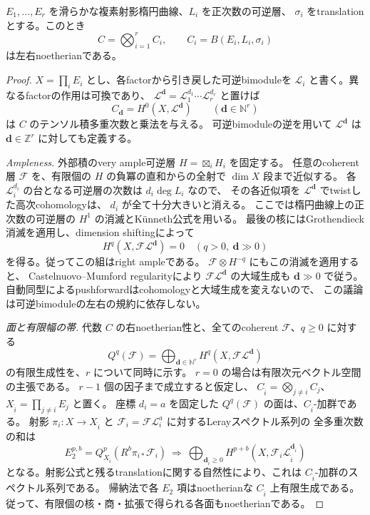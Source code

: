 \begin{lemma}[楕円THCRの有限テンソル積]
\label{lem:elliptic-thcr-tensor-noeth}
 \(E_1,\ldots,E_r\) を滑らかな複素射影楕円曲線、\(L_i\) を正次数の可逆層、
 \(\sigma_i\) をtranslationとする。このとき
 \[
 C=\bigotimes_{i=1}^r C_i,\qquad C_i=B(E_i,L_i,\sigma_i)
 \]
 は左右noetherianである。
\end{lemma}
\begin{proof}
 \(X=\prod_iE_i\) とし、各factorから引き戻した可逆bimoduleを
 \(\mathcal L_i\) と書く。異なるfactorの作用は可換であり、
 \(\mathcal L^{\mathbf d}=\mathcal L_1^{d_1}\cdots\mathcal L_r^{d_r}\) と置けば
 \[
 C_{\mathbf d}=H^0(X,\mathcal L^{\mathbf d})\qquad(\mathbf d\in\mathbb N^r)
 \]
 は \(C\) のテンソル積多重次数と乗法を与える。
 可逆bimoduleの逆を用いて \(\mathcal L^{\mathbf d}\) は
 \(\mathbf d\in\mathbb Z^r\) に対しても定義する。

 \emph{Ampleness.}
 外部積のvery ample可逆層 \(H=\boxtimes_iH_i\) を固定する。
 任意のcoherent層 \(\mathcal F\) を、有限個の \(H\) の負冪の直和からの全射で
 \(\dim X\) 段まで近似する。
 各 \(\mathcal L_i^{d_i}\) の台となる可逆層の次数は \(d_i\deg L_i\) なので、
 その各近似項を \(\mathcal L^{\mathbf d}\) でtwistした高次cohomologyは、
 \(d_i\) が全て十分大きいと消える。
 ここでは楕円曲線上の正次数の可逆層の \(H^1\) の消滅とK\"unneth公式を用いる。
 最後の核にはGrothendieck消滅を適用し、dimension shiftingによって
 \[
 H^q(X,\mathcal F\mathcal L^{\mathbf d})=0
 \quad(q>0,\ \mathbf d\gg0)
 \]
 を得る。従ってこの組はright ampleである。
 \(\mathcal F\otimes H^{-q}\) にもこの消滅を適用すると、
 Castelnuovo--Mumford regularityにより
 \(\mathcal F\mathcal L^{\mathbf d}\) の大域生成も \(\mathbf d\gg0\) で従う。
 自動同型によるpushforwardはcohomologyと大域生成を変えないので、
 この議論は可逆bimoduleの左右の規約に依存しない。

 \emph{面と有限幅の帯.}
 代数 \(C\) の右noetherian性と、全てのcoherent \(\mathcal F\)、\(q\ge0\) に対する
 \[
 Q^q(\mathcal F)=\bigoplus_{\mathbf d\in\mathbb N^r}
 H^q(X,\mathcal F\mathcal L^{\mathbf d})
 \]
 の有限生成性を、\(r\) について同時に示す。
 \(r=0\) の場合は有限次元ベクトル空間の主張である。
 \(r-1\) 個の因子まで成立すると仮定し、
 \(C_{\widehat i}=\bigotimes_{j\ne i}C_j\)、\(X_{\widehat i}=\prod_{j\ne i}E_j\) と置く。
 座標 \(d_i=a\) を固定した \(Q^q(\mathcal F)\) の面は、\(C_{\widehat i}\)-加群である。
 射影 \(\pi_i:X\to X_{\widehat i}\) と
 \(\mathcal F_i=\mathcal F\mathcal L_i^a\) に対するLerayスペクトル系列の
 全多重次数の和は
 \[
 E_2^{p,b}=Q^p_{X_{\widehat i}}
       (R^b\pi_{i*}\mathcal F_i)
 \ \Longrightarrow\
 \bigoplus_{\mathbf d_{\widehat i}\ge0}
 H^{p+b}(X,\mathcal F_i\mathcal L_{\widehat i}^{\mathbf d_{\widehat i}})
 \]
 となる。射影公式と残るtranslationに関する自然性により、これは
 \(C_{\widehat i}\)-加群のスペクトル系列である。
 帰納法で各 \(E_2\) 項はnoetherianな \(C_{\widehat i}\) 上有限生成である。
 従って、有限個の核・商・拡張で得られる各面もnoetherianである。


\end{proof}
